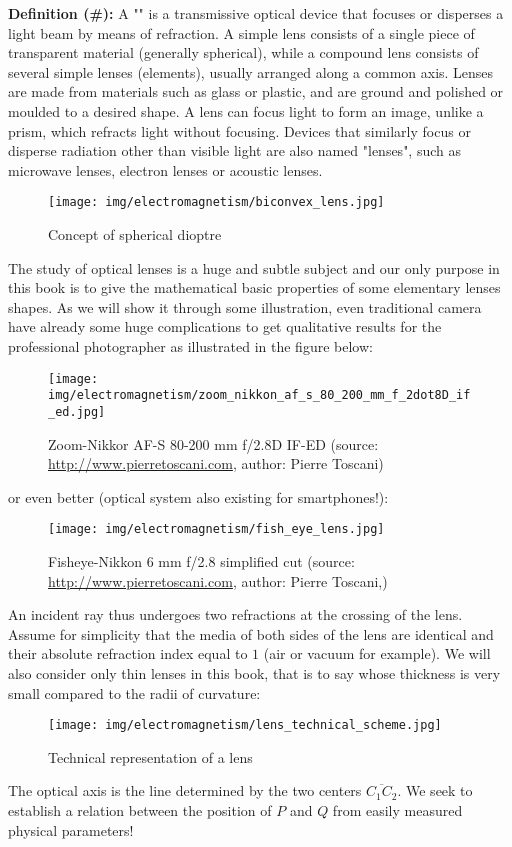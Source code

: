 	\textbf{Definition (\#\mydef):} A "" is a transmissive optical device that focuses or disperses a light beam by means of refraction. A simple lens consists of a single piece of transparent material (generally spherical), while a compound lens consists of several simple lenses (elements), usually arranged along a common axis. Lenses are made from materials such as glass or plastic, and are ground and polished or moulded to a desired shape. A lens can focus light to form an image, unlike a prism, which refracts light without focusing. Devices that similarly focus or disperse radiation other than visible light are also named "lenses", such as microwave lenses, electron lenses or acoustic lenses.
	\begin{figure}[H]
		\centering
		\texttt{[image: img/electromagnetism/biconvex\_lens.jpg]}
		\caption{Concept of spherical dioptre}
	\end{figure}
	The study of optical lenses is a huge and subtle subject and our only purpose in this book is to give the mathematical basic properties of some elementary lenses shapes. As we will show it through some illustration, even traditional camera have already some huge complications to get qualitative results for the professional photographer as illustrated in the figure below:
	\begin{figure}[H]
		\centering
		\texttt{[image: img/electromagnetism/zoom\_nikkon\_af\_s\_80\_200\_mm\_f\_2dot8D\_if\_ed.jpg]}
		\caption[Zoom-Nikkor AF-S 80-200 mm f/2.8D IF-ED]{Zoom-Nikkor AF-S 80-200 mm f/2.8D IF-ED (source: \url{http://www.pierretoscani.com}, author: Pierre Toscani)}
	\end{figure}
	or even better (optical system also existing for smartphones!):
	\begin{figure}[H]
		\centering
		\texttt{[image: img/electromagnetism/fish\_eye\_lens.jpg]}
		\caption[Fisheye-Nikkon 6 mm f/2.8 simplified cut]{Fisheye-Nikkon 6 mm f/2.8 simplified cut (source: \url{http://www.pierretoscani.com}, author: Pierre Toscani,)}
	\end{figure}
	An incident ray thus undergoes two refractions at the crossing of the lens. Assume for simplicity that the media of both sides of the lens are identical and their absolute refraction index equal to $1$ (air or vacuum for example). We will also consider only thin lenses in this book, that is to say whose thickness is very small compared to the radii of curvature:
	\begin{figure}[H]
		\centering
		\texttt{[image: img/electromagnetism/lens\_technical\_scheme.jpg]}
		\caption{Technical representation of a lens}
	\end{figure}
	The optical axis is the line determined by the two centers $\overline{C_1C_2}$. We seek to establish a relation between the position of $P$ and $Q$ from easily measured physical parameters!

